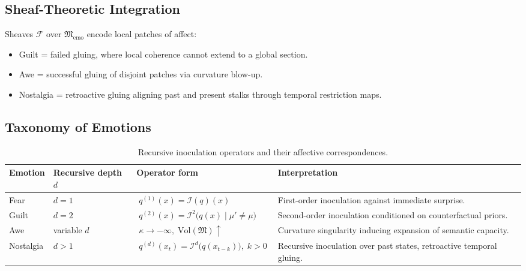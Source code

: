 \documentclass{article}
\theoremstyle{definition}
\begin{document}
\subsection{Sheaf-Theoretic Integration}

Sheaves $\mathcal{F}$ over $\mathfrak{M}_{\text{emo}}$ encode 
local patches of affect:

\begin{itemize}
  \item Guilt = failed gluing, where local coherence cannot extend 
        to a global section.  
  \item Awe = successful gluing of disjoint patches via curvature blow-up.  
  \item Nostalgia = retroactive gluing aligning past and present stalks 
        through temporal restriction maps.  
\end{itemize}

\subsection{Taxonomy of Emotions}

\begin{table}[ht]
\centering
\caption{Recursive inoculation operators and their affective correspondences.}
\label{tab:inoculation}
\renewcommand{\arraystretch}{1.3}
\begin{tabularx}{\textwidth}{@{}l>{\centering\arraybackslash}X>{\centering\arraybackslash}X>{\centering\arraybackslash}X@{}}
\toprule
\textbf{Emotion} & \textbf{Recursive depth $d$} & \textbf{Operator form} & \textbf{Interpretation} \\
\midrule
Fear & $d=1$ &
$\;q^{(1)}(x) = \mathcal{I}(q)(x)\;$ &
First-order inoculation against immediate surprise. \\
\addlinespace
Guilt & $d=2$ &
$\;q^{(2)}(x) = \mathcal{I}^2\!\big(q(x)\mid \mu' \neq \mu\big)\;$ &
Second-order inoculation conditioned on counterfactual priors. \\
\addlinespace
Awe & variable $d$ &
$\;\kappa \to -\infty,\; \mathrm{Vol}(\mathfrak{M}) \uparrow\;$ &
Curvature singularity inducing expansion of semantic capacity. \\
\addlinespace
Nostalgia & $d>1$ &
$\;q^{(d)}(x_t) = \mathcal{I}^d\big(q(x_{t-k})\big),\; k>0\;$ &
Recursive inoculation over past states, retroactive temporal gluing. \\
\bottomrule
\end{tabularx}
\end{table}
\end{document}
